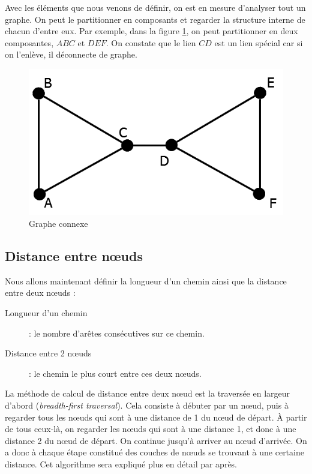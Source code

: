Avec les éléments que nous venons de définir, on est en mesure d'analyser tout un graphe. On peut le partitionner en composants et regarder la structure interne de chacun d'entre eux. Par exemple, dans la figure \ref{gr_connexe}, on peut partitionner en deux composantes, $ABC$ et $DEF$. On constate que le lien $CD$ est un lien spécial car si on l'enlève, il déconnecte de graphe.\\
	\begin{figure}
	\center
	\includegraphics[scale=0.3]{images/18_gr_connexe.png}
	\caption{\label{gr_connexe} Graphe connexe}
	\end{figure}

\subsection{Distance entre n\oe uds}
Nous allons maintenant définir la longueur d'un chemin ainsi que la distance entre deux n\oe uds :
\begin{description}
\item[Longueur d'un chemin] : le nombre d'arêtes consécutives sur ce chemin.
\item [Distance entre 2 n\oe uds] : le chemin le plus court entre ces deux n\oe uds.
\end{description}

La méthode de calcul de distance entre deux n\oe ud est la traversée en largeur d'abord (\emph{breadth-first traversal}). Cela consiste à débuter par un n\oe ud, puis à regarder tous les n\oe uds qui sont à une distance de 1 du n\oe ud de départ. À partir de tous ceux-là, on regarder les n\oe uds qui sont à une distance 1, et donc à une distance 2 du n\oe ud de départ. On continue jusqu'à arriver au n\oe ud d'arrivée. On a donc à chaque étape constitué des couches de n\oe uds se trouvant à une certaine distance. Cet algorithme sera expliqué plus en détail par après.\\

